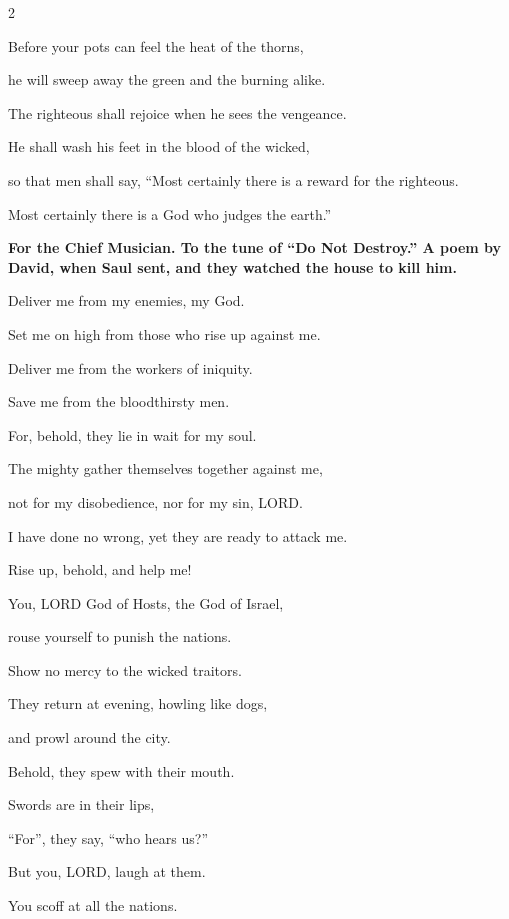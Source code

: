 \begin{multicols}{2}
	
	\myverse{}Before your pots can feel the heat of the thorns,
	
	he will sweep away the green and the burning alike.
	
	
	\myverse{}The righteous shall rejoice when he sees the vengeance.
	
	He shall wash his feet in the blood of the wicked,
	
	
	\myverse{}so that men shall say, “Most certainly there is a reward for
	the righteous.
	
	Most certainly there is a God who judges the earth.”
	
	
	\mychapter{}\textbf{For the Chief Musician. To the tune of “Do Not Destroy.” A poem by David, when Saul sent,
		and they watched the house to kill him.}
	
	\myverse*{}Deliver me from my enemies, my God.
	
	Set me on high from those who rise up against me.
	
	
	\myverse{}Deliver me from the workers of iniquity.
	
	Save me from the bloodthirsty men.
	
	
	\myverse{}For, behold, they lie in wait for my soul.
	
	The mighty gather themselves together against me,
	
	not for my disobedience, nor for my sin, LORD.
	
	
	\myverse{}I have done no wrong, yet they are ready to attack me.
	
	Rise up, behold, and help me!
	
	
	\myverse{}You, LORD God of Hosts, the God of Israel,
	
	rouse yourself to punish the nations.
	
	Show no mercy to the wicked traitors.
	
	\vspace{\baselineskip}		
	
	\myverse{}They return at evening, howling like dogs,
	
	and prowl around the city.
	
	
	\myverse{}Behold, they spew with their mouth.
	
	Swords are in their lips,
	
	“For”, they say, “who hears us?”
	
	
	\myverse{}But you, LORD, laugh at them.
	
	You scoff at all the nations.
	

\end{multicols}
